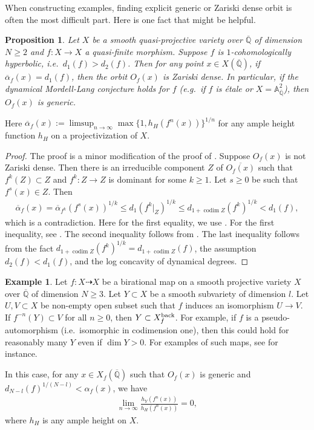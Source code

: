 \documentclass[12pt]{amsart}
\theoremstyle{plain}
\newtheorem{proposition}[theorem]{Proposition}
\theoremstyle{definition}
\newtheorem{example}[theorem]{Example}
\numberwithin{equation}{section}
\def\A{{\mathbb A}}
\def\QQ{\overline{\mathbb Q}}
\DeclareMathOperator{\codim}{codim}
\begin{document}
When constructing examples, finding explicit generic or Zariski dense orbit is 
often the most difficult part.
Here is one fact that might be helpful.

\begin{proposition}
Let $X$ be a smooth quasi-projective variety over $\QQ$ of dimension $N \geq 2$
and $f \colon X \longrightarrow X$ a quasi-finite morphism.
Suppose $f$ is $1$-cohomologically hyperbolic, i.e.\ $d_{1}(f) > d_{2}(f)$.
Then for any point $x \in X(\QQ)$, if $ \overline{\alpha}_{f}(x) = d_{1}(f)$, then the orbit $O_{f}(x)$
is Zariski dense. 
In particular,  if the dynamical Mordell-Lang conjecture holds for $f$ (e.g.\ if $f$ is \'etale or $X = \A^{2}_{\QQ}$), 
then $O_{f}(x)$ is generic.
\end{proposition}
Here $ \overline{\alpha}_{f}(x) := \limsup_{n \to \infty} \max\{1 , h_{H}(f^{n}(x))\}^{1/n}$
for any ample height function $h_{H}$ on a projectivization of $X$.
\begin{proof}
The proof is a minor modification of the proof of \cite[Proposition 4.6]{MW22}.
Suppose $O_{f}(x)$ is not Zariski dense.
Then there is an irreducible component $Z$ of $ \overline{O_{f}(x)}$ such that
$f^{k}(Z) \subset Z$ and $f^{k} \colon Z \longrightarrow Z$ is dominant for some $k \geq 1$.
Let $s \geq 0$ be such that $f^{s}(x) \in Z$.
Then
\begin{align}
\overline{\alpha}_{f}(x) = \overline{\alpha}_{f^{k}}(f^{s}(x))^{1/k}  \leq d_{1}(f^{k}|_{Z})^{1/k} \leq d_{1 + \codim Z}(f^{k})^{1/k} < d_{1}(f),
\end{align}
which is a contradiction.
Here for the first equality, we use \cite[Lemma 2.7]{MW22}.
For the first inequality, see \cite[Proposition 2.6]{MW22}.
The second inequality follows from \cite[Lemma 2.3]{MW22}.
The last inequality follows from the fact $d_{1 + \codim Z}(f^{k})^{1/k} = d_{1 + \codim Z}(f)$, the assumption $d_{2}(f) < d_{1}(f)$,
and the log concavity of dynamical degrees.
\end{proof}







\begin{example}
Let $f \colon X \dashrightarrow X$ be a birational map on a smooth projective variety $X$ over $\QQ$
of dimension $N \geq 3$.
Let $Y \subset X$ be a smooth subvariety of dimension $l$.
Let $U, V \subset X$ be non-empty open subset such that $f$ induces an isomorphism $U \longrightarrow V$.
If $f^{-n}(Y) \subset V$ for all $n \geq 0$, then $Y \subset X_{f}^{\rm back}$.
For example, if $f$ is a pseudo-automorphism (i.e.\ isomorphic in codimension one), then
this could hold for reasonably many $Y$ even if $\dim Y > 0$.
For examples of such maps, see \cite{Bl13,PZ14,BK14,OT15} for instance.

In this case, for any $x \in X_{f}(\QQ)$ such that $O_{f}(x)$ is generic and
$d_{N-l}(f)^{1/(N-l)} < \alpha_{f}(x) $, we have
\begin{align}
\lim_{n \to \infty} \frac{h_{Y}(f^{n}(x))}{h_{H}(f^{n}(x))} = 0,
\end{align}
where $h_{H}$ is any ample height on $X$.
\end{example}
\end{document}
